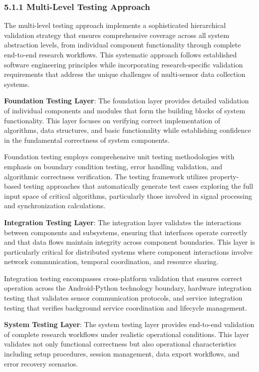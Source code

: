 \documentclass[12pt,a4paper]{article}
\begin{document}
\subsubsection{5.1.1 Multi-Level Testing Approach}

The multi-level testing approach implements a sophisticated hierarchical validation strategy that ensures comprehensive
coverage across all system abstraction levels, from individual component functionality through complete end-to-end
research workflows. This systematic approach follows established software engineering principles while incorporating
research-specific validation requirements that address the unique challenges of multi-sensor data collection systems.

\textbf{Foundation Testing Layer}: The foundation layer provides detailed validation of individual components and modules
that form the building blocks of system functionality. This layer focuses on verifying correct implementation of
algorithms, data structures, and basic functionality while establishing confidence in the fundamental correctness of
system components.

Foundation testing employs comprehensive unit testing methodologies with emphasis on boundary condition testing, error
handling validation, and algorithmic correctness verification. The testing framework utilizes property-based testing
approaches that automatically generate test cases exploring the full input space of critical algorithms, particularly
those involved in signal processing and synchronization calculations.

\textbf{Integration Testing Layer}: The integration layer validates the interactions between components and subsystems,
ensuring that interfaces operate correctly and that data flows maintain integrity across component boundaries. This
layer is particularly critical for distributed systems where component interactions involve network communication,
temporal coordination, and resource sharing.

Integration testing encompasses cross-platform validation that ensures correct operation across the Android-Python
technology boundary, hardware integration testing that validates sensor communication protocols, and service integration
testing that verifies background service coordination and lifecycle management.

\textbf{System Testing Layer}: The system testing layer provides end-to-end validation of complete research workflows under
realistic operational conditions. This layer validates not only functional correctness but also operational
characteristics including setup procedures, session management, data export workflows, and error recovery scenarios.
\end{document}
